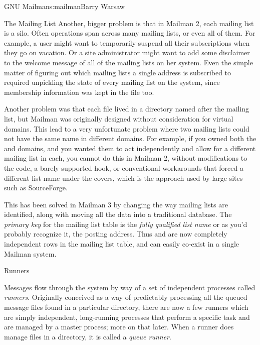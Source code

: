 \begin{aosachapter}{GNU Mailman}{s:mailman}{Barry Warsaw}
\begin{aosasect1}{The Mailing List}
Another, bigger problem is that in Mailman 2, each mailing list is a
silo.  Often operations span across many mailing lists, or even all of
them.  For example, a user might want to temporarily suspend all their
subscriptions when they go on vacation.  Or a site administrator might
want to add some disclaimer to the welcome message of all of the
mailing lists on her system.  Even the simple matter of figuring out
which mailing lists a single address is subscribed to required
unpickling the state of every mailing list on the system, since
membership information was kept in the  file too.

Another problem was that each  file lived in a
directory named after the mailing list, but Mailman was originally
designed without consideration for virtual domains.  This lead to a
very unfortunate problem where two mailing lists could not have the
same name in different domains.  For example, if you owned both the
 and  domains, and you wanted them
to act independently and allow for a different  mailing
list in each, you cannot do this in Mailman 2, without modifications
to the code, a barely-supported hook, or conventional workarounds that
forced a different list name under the covers, which is the approach
used by large sites such as SourceForge.

This has been solved in Mailman 3 by changing the way mailing lists
are identified, along with moving all the data into a traditional
database.  The \emph{primary key} for the mailing list table is the
\emph{fully qualified list name} or as you'd probably recognize it,
the posting address.  Thus  and
 are now completely independent rows in the
mailing list table, and can easily co-exist in a single Mailman
system.

\end{aosasect1}

\begin{aosasect1}{Runners}

Messages flow through the system by way of a set of independent
processes called \emph{runners}.  Originally conceived as a way of
predictably processing all the queued message files found in a
particular directory, there are now a few runners which are simply
independent, long-running processes that perform a specific task and
are managed by a master process; more on that later.  When a runner
does manage files in a directory, it is called a \emph{queue runner}.


\end{aosasect1}
\end{aosachapter}
